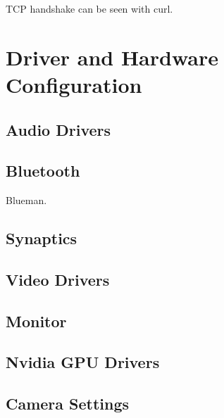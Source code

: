 \documentclass{article}
\begin{document}
    TCP handshake can be seen with curl. 


\section{Driver and Hardware Configuration}

  \subsection{Audio Drivers} 


  \subsection{Bluetooth}
    Blueman. 

  \subsection{Synaptics}


  \subsection{Video Drivers}


  \subsection{Monitor}


  \subsection{Nvidia GPU Drivers} 

  \subsection{Camera Settings}
\end{document}
